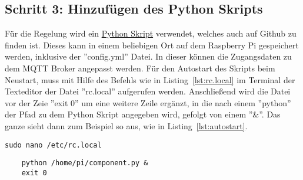 \subsection{Schritt 3: Hinzufügen des Python Skripts}
Für die Regelung wird ein \href{https://github.com/maxbachmann-university/blind-controller}{Python Skript} verwendet, welches auch auf Github zu finden ist. Dieses kann in einem beliebigen Ort auf dem Raspberry Pi gespeichert werden, inklusive der ''config.yml'' Datei. In dieser können die Zugangsdaten zu dem MQTT Broker angepasst werden. Für den Autostart des Skripts beim Neustart, muss mit Hilfe des Befehls wie in Listing~\ref{lst:rc.local} im Terminal der Texteditor der Datei ''rc.local'' aufgerufen werden. Anschließend wird die Datei vor der Zeie ''exit 0'' um eine weitere Zeile ergänzt, in die nach einem ''python'' der Pfad zu dem Python Skript angegeben wird, gefolgt von einem ''\&''. Das ganze sieht dann zum Beispiel so aus, wie in Listing~\ref{lst:autostart}.

\begin{lstlisting}
sudo nano /etc/rc.local
\end{lstlisting}

\lstset{language=Python}
\begin{lstlisting}
	python /home/pi/component.py &
	exit 0
\end{lstlisting}
